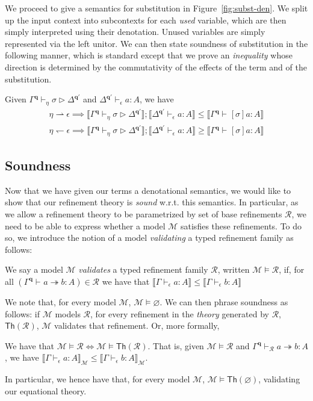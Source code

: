 \documentclass[acmsmall,screen,review]{acmart}
\newcommand{\mc}[1]{\ensuremath{\mathcal{#1}}}
\newcommand{\mb}[1]{\ensuremath{\mathbf{#1}}}
\newcommand{\ms}[1]{\ensuremath{\mathsf{#1}}}
\newcommand{\hasty}[4]{#1 \vdash_{#2} #3: {#4}}
\newcommand{\issubst}[4]{#1 \vdash_{#2} #3 \rhd #4}
\newcommand{\tref}{\twoheadrightarrow}
\newcommand{\tmle}[5]{#1 \vdash_{#2} #3 \tref #4 : {#5}}
\newcommand{\dnt}[1]{\llbracket{#1}\rrbracket}
\newcommand{\rightmove}{\rightharpoonup}
\newcommand{\leftmove}{\leftharpoondown}
\begin{document}
We proceed to give a semantics for substitution in Figure~\ref{fig:subst-den}. We split up the input
context into subcontexts for each \emph{used} variable, which are then simply interpreted using
their denotation. Unused variables are simply represented via the left unitor. We can then state
soundness of substitution in the following manner, which is standard except that we prove an
\emph{inequality} whose direction is determined by the commutativity of the effects of the term and
of the substitution. 

\begin{theorem}
  Given $\issubst{\Gamma^{\mb{q}}}{\eta}{\sigma}{\Delta^{\mb{q'}}}$ and
  $\hasty{\Delta^{\mb{q}'}}{\epsilon}{a}{A}$, we have
  \begin{align*}
  \eta \rightmove \epsilon \implies
  \dnt{\issubst{\Gamma^{\mb{q}}}{\eta}{\sigma}{\Delta^{\mb{q'}}}} 
    ; \dnt{\hasty{\Delta^{\mb{q}'}}{\epsilon}{a}{A}}
  \leq \dnt{\hasty{\Gamma^{\mb{q}}}{}{[\sigma]a}{A}} \\
  \eta \leftmove \epsilon \implies
  \dnt{\issubst{\Gamma^{\mb{q}}}{\eta}{\sigma}{\Delta^{\mb{q'}}}} 
    ; \dnt{\hasty{\Delta^{\mb{q}'}}{\epsilon}{a}{A}}
  \geq \dnt{\hasty{\Gamma^{\mb{q}}}{}{[\sigma]a}{A}}
  \end{align*}
\end{theorem}

\subsection{Soundness}

Now that we have given our terms a denotational semantics, we would like to show that our refinement
theory is \emph{sound} w.r.t. this semantics. In particular, as we allow a refinement theory to be
parametrized by set of base refinements $\mc{R}$, we need to be able to express whether a model
$\mc{M}$ satisfies these refinements. To do so, we introduce the notion of a model \emph{validating}
a typed refinement family as follows:
\begin{definition}
  We say a model $\mc{M}$ \emph{validates} a typed refinement family $\mc{R}$, written $\mc{M}
  \models \mc{R}$, if, for all
  $
  (\tmle{\Gamma^{\mb{q}}}{}{a}{b}{A}) \in \mc{R}
  $
  we have that
  $
  \dnt{\hasty{\Gamma}{\epsilon}{a}{A}} \leq \dnt{\hasty{\Gamma}{\epsilon}{b}{A}}
  $
\end{definition}
We note that, for every model $\mc{M}$, $\mc{M} \models \varnothing$. We can then phrase soundness
as follows: if $\mc{M}$ models $\mc{R}$, for every refinement in the \emph{theory} generated by
$\mc{R}$, $\ms{Th}(\mc{R})$, $\mc{M}$ validates that refinement. Or, more formally,
\begin{theorem}[Soundness]
  We have that $\mc{M} \models \mc{R} \iff \mc{M} \models \ms{Th}(\mc{R})$. That is, given $\mc{M}
  \models \mc{R}$ and $\tmle{\Gamma^{\mb{q}}}{\mc{R}}{a}{b}{A}$, we have
  $\dnt{\hasty{\Gamma}{\epsilon}{a}{A}}_{\mc{M}} \leq
  \dnt{\hasty{\Gamma}{\epsilon}{b}{A}}_{\mc{M}}$.
\end{theorem}
In particular, we hence have that, for every model $\mc{M}$, $\mc{M} \models \ms{Th}(\varnothing)$,
validating our equational theory.
\end{document}
